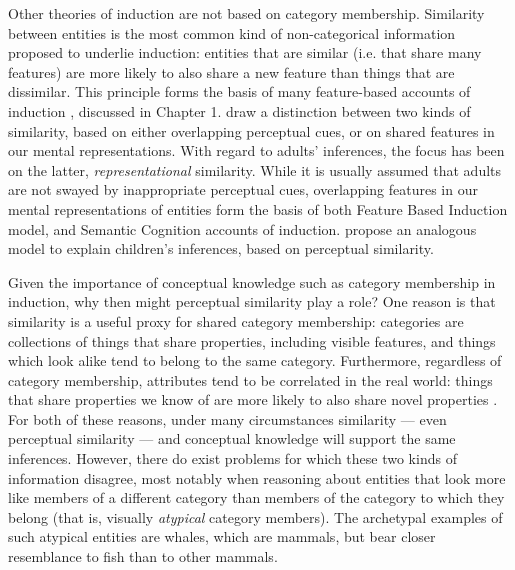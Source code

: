 Other theories of induction are not based on category membership.
Similarity between entities is the most common kind of
non-categorical information proposed to underlie induction:
entities that are similar (i.e. that share many features)
are more likely to also share a new feature
than things that are dissimilar.
This principle forms the basis of many feature-based accounts of induction
\citep{Sloman1993,Rogers2004,Sloutsky2004,Fisher2015},
discussed in Chapter 1.
\citet{Fisher2015} draw a distinction between two kinds of similarity,
based on either overlapping perceptual cues,
or on shared features in our mental representations.
With regard to adults' inferences,
the focus has been on the latter, \emph{representational} similarity.
While it is usually assumed that adults
are not swayed by inappropriate perceptual cues,
overlapping features in our mental representations of entities
form the basis of both  Feature Based Induction model,
and  Semantic Cognition accounts of induction.
\citet{Sloutsky2008,Sloutsky2004} propose
an analogous model to explain children's inferences,
based on perceptual similarity.

Given the importance of conceptual knowledge such as category membership in induction,
why then might perceptual similarity play a role?
One reason is that similarity is a useful proxy for shared category membership:
categories are collections of things that share properties, 
including visible features,
and things which look alike tend to belong to the same category.
Furthermore, regardless of category membership,
attributes tend to be correlated in the real world:
things that share properties we know of
are more likely to also share novel properties
\cite[see, e.g.,][]{Kemp2012}.
For both of these reasons, under many circumstances 
similarity --- even perceptual similarity ---
and conceptual knowledge will support the same inferences.
However, there do exist problems for which
these two kinds of information disagree,
most notably when reasoning about entities
that look more like members of a different category
than members of the category to which they belong
(that is, visually \emph{atypical} category members).
The archetypal examples of such atypical entities are whales,
which are mammals, but bear closer resemblance to fish
than to other mammals.


